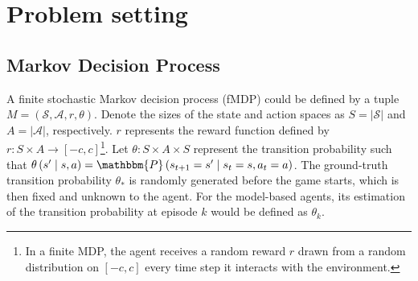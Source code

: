 \documentclass{article}
\theoremstyle{plain}
\theoremstyle{definition}
\theoremstyle{remark}
\begin{document}
\section{Problem setting}
\subsection{Markov Decision Process}
A finite stochastic Markov decision process (fMDP) \citep{ferns2004metrics} could be defined by a tuple $M=(\mathcal{S}, \mathcal{A}, r, \theta )$. Denote the sizes of the state and action spaces as $S=|\mathcal{S}|$ and $A=|\mathcal{A}|$, respectively. $r$ represents the reward function defined by $r: S \times A \rightarrow [-c,c]$\footnote{In a finite MDP, the agent receives a random reward $r$ drawn from a random distribution on $[-c,c]$ every time step it interacts with the environment.}. Let $\theta: S \times A \times S$ represent the transition probability such that $\theta\left(s^{\prime} \mid s, a\right)=\mathbbm{P}\left(s_{t+1}=s^{\prime} \mid s_{t}=s, a_{t}=a\right)$. The ground-truth transition probability $\theta_{*}$ is randomly generated before the game starts, which is then fixed and unknown to the agent. For the model-based agents, its estimation of the transition probability at episode $k$ would be defined as $\theta_{k}$. 

\end{document}
